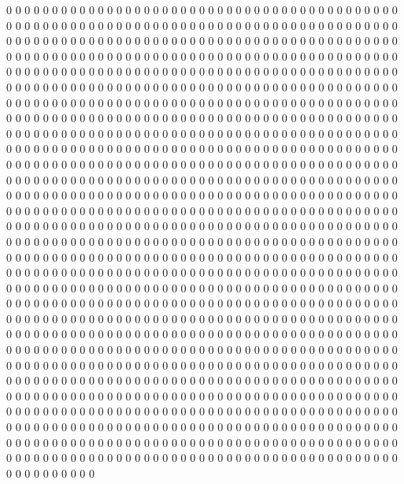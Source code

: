 0 0 0 0 0 0 0 0 0 0 0 0 0 0 0 0 0 0 0 0
0 0 0 0 0 0 0 0 0 0 0 0 0 0 0 0 0 0 0 0
0 0 0 0 0 0 0 0 0 0 0 0 0 0 0 0 0 0 0 0
0 0 0 0 0 0 0 0 0 0 0 0 0 0 0 0 0 0 0 0
0 0 0 0 0 0 0 0 0 0 0 0 0 0 0 0 0 0 0 0
0 0 0 0 0 0 0 0 0 0 0 0 0 0 0 0 0 0 0 0
0 0 0 0 0 0 0 0 0 0 0 0 0 0 0 0 0 0 0 0
0 0 0 0 0 0 0 0 0 0 0 0 0 0 0 0 0 0 0 0
0 0 0 0 0 0 0 0 0 0 0 0 0 0 0 0 0 0 0 0
0 0 0 0 0 0 0 0 0 0 0 0 0 0 0 0 0 0 0 0
0 0 0 0 0 0 0 0 0 0 0 0 0 0 0 0 0 0 0 0
0 0 0 0 0 0 0 0 0 0 0 0 0 0 0 0 0 0 0 0
0 0 0 0 0 0 0 0 0 0 0 0 0 0 0 0 0 0 0 0
0 0 0 0 0 0 0 0 0 0 0 0 0 0 0 0 0 0 0 0
0 0 0 0 0 0 0 0 0 0 0 0 0 0 0 0 0 0 0 0
0 0 0 0 0 0 0 0 0 0 0 0 0 0 0 0 0 0 0 0
0 0 0 0 0 0 0 0 0 0 0 0 0 0 0 0 0 0 0 0
0 0 0 0 0 0 0 0 0 0 0 0 0 0 0 0 0 0 0 0
0 0 0 0 0 0 0 0 0 0 0 0 0 0 0 0 0 0 0 0
0 0 0 0 0 0 0 0 0 0 0 0 0 0 0 0 0 0 0 0
0 0 0 0 0 0 0 0 0 0 0 0 0 0 0 0 0 0 0 0
0 0 0 0 0 0 0 0 0 0 0 0 0 0 0 0 0 0 0 0
0 0 0 0 0 0 0 0 0 0 0 0 0 0 0 0 0 0 0 0
0 0 0 0 0 0 0 0 0 0 0 0 0 0 0 0 0 0 0 0
0 0 0 0 0 0 0 0 0 0 0 0 0 0 0 0 0 0 0 0
0 0 0 0 0 0 0 0 0 0 0 0 0 0 0 0 0 0 0 0
0 0 0 0 0 0 0 0 0 0 0 0 0 0 0 0 0 0 0 0
0 0 0 0 0 0 0 0 0 0 0 0 0 0 0 0 0 0 0 0
0 0 0 0 0 0 0 0 0 0 0 0 0 0 0 0 0 0 0 0
0 0 0 0 0 0 0 0 0 0 0 0 0 0 0 0 0 0 0 0
0 0 0 0 0 0 0 0 0 0 0 0 0 0 0 0 0 0 0 0
0 0 0 0 0 0 0 0 0 0 0 0 0 0 0 0 0 0 0 0
0 0 0 0 0 0 0 0 0 0 0 0 0 0 0 0 0 0 0 0
0 0 0 0 0 0 0 0 0 0 0 0 0 0 0 0 0 0 0 0
0 0 0 0 0 0 0 0 0 0 0 0 0 0 0 0 0 0 0 0
0 0 0 0 0 0 0 0 0 0 0 0 0 0 0 0 0 0 0 0
0 0 0 0 0 0 0 0 0 0 0 0 0 0 0 0 0 0 0 0
0 0 0 0 0 0 0 0 0 0 0 0 0 0 0 0 0 0 0 0
0 0 0 0 0 0 0 0 0 0 0 0 0 0 0 0 0 0 0 0
0 0 0 0 0 0 0 0 0 0 0 0 0 0 0 0 0 0 0 0
0 0 0 0 0 0 0 0 0 0 0 0 0 0 0 0 0 0 0 0
0 0 0 0 0 0 0 0 0 0 0 0 0 0 0 0 0 0 0 0
0 0 0 0 0 0 0 0 0 0 0 0 0 0 0 0 0 0 0 0
0 0 0 0 0 0 0 0 0 0 0 0 0 0 0 0 0 0 0 0
0 0 0 0 0 0 0 0 0 0 0 0 0 0 0 0 0 0 0 0
0 0 0 0 0 0 0 0 0 0 0 0 0 0 0 0 0 0 0 0
0 0 0 0 0 0 0 0 0 0 0 0 0 0 0 0 0 0 0 0
0 0 0 0 0 0 0 0 0 0 0 0 0 0 0 0 0 0 0 0
0 0 0 0 0 0 0 0 0 0 0 0 0 0 0 0 0 0 0 0
0 0 0 0 0 0 0 0 0 0 0 0 0 0 0 0 0 0 0 0
0 0 0 0 0 0 0 0 0 0 0 0 0 0 0 0 0 0 0 0
0 0 0 0 0 0 0 0 0 0 0 0 0 0 0 0 0 0 0 0
0 0 0 0 0 0 0 0 0 0 0 0 0 0 0 0 0 0 0 0
0 0 0 0 0 0 0 0 0 0 0 0 0 0 0 0 0 0 0 0
0 0 0 0 0 0 0 0 0 0 0 0 0 0 0 0 0 0 0 0
0 0 0 0 0 0 0 0 0 0 0 0 0 0 0 0 0 0 0 0
0 0 0 0 0 0 0 0 0 0 0 0 0 0 0 0 0 0 0 0
0 0 0 0 0 0 0 0 0 0 0 0 0 0 0 0 0 0 0 0
0 0 0 0 0 0 0 0 0 0 0 0 0 0 0 0 0 0 0 0
0 0 0 0 0 0 0 0 0 0 0 0 0 0 0 0 0 0 0 0
0 0 0 0 0 0 0 0 0 0 0 0 0 0 0 0 0 0 0 0
0 0 0 0 0 0 0 0 0 0 0 0 0 0 0 0 0 0 0 0
0 0 0 0 0 0 0 0 0 0 0 0 0 0 0 0 0 0 0 0
0 0 0 0 0 0 0 0 0 0 0 0 0 0 0 0 0 0 0 0
0 0 0 0 0 0 0 0 0 0 0 0 0 0 0 0 0 0 0 0
